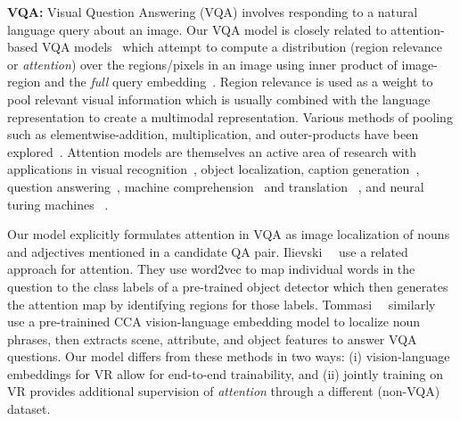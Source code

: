 \noindent \textbf{VQA:} Visual Question Answering (VQA) involves responding to a natural language query about an image. Our VQA model is closely related to attention-based VQA models~\cite{fukui2016multimodal,ilievski2016focused,lu2016hierarchical,xu2016ask,shih2016look,yang2015stacked,andreas2016neural,andreas2016learning, kumar2015ask,tommasi2016bmvc} which attempt to compute a distribution (region relevance or \textit{attention}) over the regions/pixels in an image using inner product of image-region and the \textit{full} query embedding~\cite{xu2016ask, shih2016look, ilievski2016focused,lu2016hierarchical}. Region relevance is used as a weight to pool relevant visual information which is usually combined with the language representation to create a multimodal representation. 
Various methods of pooling such as elementwise-addition, multiplication, and outer-products have been explored~\cite{yang2015stacked, fukui2016multimodal}. Attention models are themselves an active area of research with applications in visual recognition~\cite{mnih2014nips,jaderberg2015nips}, object localization, caption generation~\cite{johnson2015arxiv}, question answering~\cite{weston2014memory,sukhbaatar2015end,kumar2015ask}, machine comprehension~\cite{hermann2015teaching} and translation ~\cite{bahdanau2014arxiv,wu2016arxiv}, and neural turing machines ~\cite{graves2014arxiv}.
  
Our model explicitly formulates attention in VQA as image localization of nouns and adjectives mentioned in a candidate QA pair. Ilievski~\etal~\cite{ilievski2016focused} use a related approach for attention. They use word2vec to map individual words in the question to the class labels of a pre-trained object detector which then generates the attention map by identifying regions for those labels. Tommasi~\etal~\cite{tommasi2016bmvc} similarly use a pre-trainined CCA \cite{gong2014improving} vision-language embedding model to localize noun phrases, then extracts scene, attribute, and object features to answer VQA questions. Our model differs from these methods in two ways: (i) vision-language embeddings for VR allow for end-to-end trainability, and (ii) jointly training on VR provides additional supervision of \textit{attention} through a different (non-VQA) dataset. 



